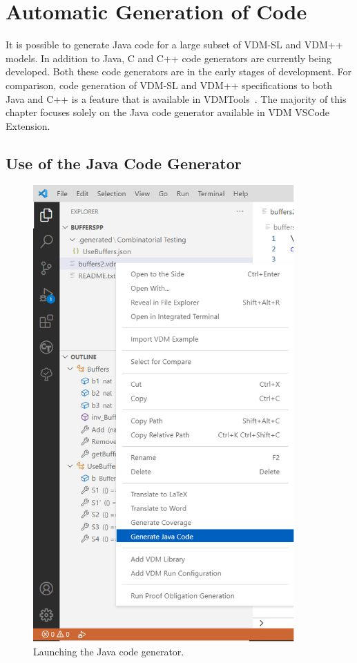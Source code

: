 
\newcommand{\vdmkw}[1]{\texttt{\textbf{#1}}}
\chapter{Automatic Generation of Code}\label{sec:codegen}

It is possible to generate Java code for a
large subset of VDM-SL and VDM++ models. In addition to Java, C and
C++ code generators are currently being developed. Both these code
generators are in the early stages of development. For
comparison, code generation of VDM-SL and VDM++ specifications to both
Java and C++ is a feature that is available in
VDMTools~\cite{Java2VDMMan,CGMan,CGManPP}. The majority of this
chapter focuses solely on the Java code generator available in
VDM VSCode Extension.

\section{Use of the Java Code Generator}
\label{sec:javacg_use}

\begin{figure}[htbp]
\begin{center}
\includegraphics[width=10cm]{snapshots/Launching the java code generator.png}
\caption{Launching the Java code generator.\label{fig:javacg_menu}}
\end{center}
\end{figure}

